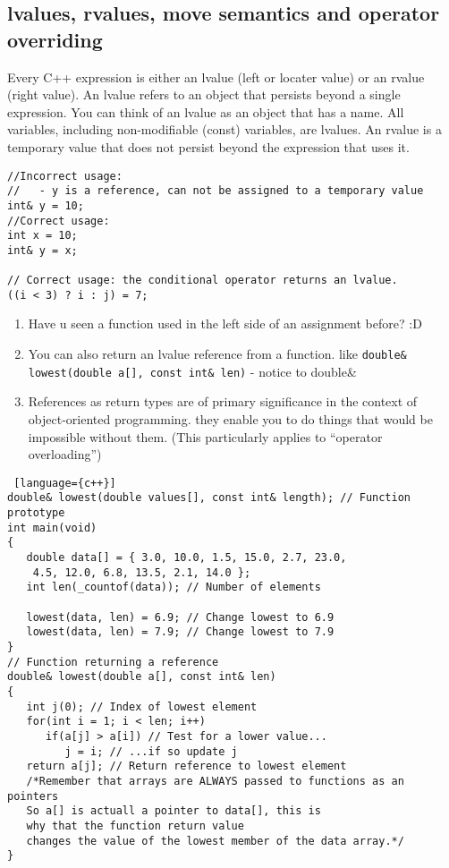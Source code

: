 \subsection{lvalues, rvalues, move semantics and operator overriding}
Every C++ expression is either an lvalue (left or locater value) or an rvalue (right value). An lvalue refers to an object that persists beyond a single expression. You can think of an lvalue as an object that has a name. All variables, including non-modifiable (const) variables, are lvalues. An rvalue is a temporary value that does not persist beyond the expression that uses it. 
\begin{note}
\begin{lstlisting}
//Incorrect usage:
//   - y is a reference, can not be assigned to a temporary value
int& y = 10; 
//Correct usage:
int x = 10;
int& y = x;

// Correct usage: the conditional operator returns an lvalue.
((i < 3) ? i : j) = 7;
\end{lstlisting}
\end{note}
\begin{note}
\begin{enumerate}
\item Have u seen a function used in the left side of an assignment before? :D
\item You can also return an lvalue reference from a function. like \lstinline[columns=fixed]{double& lowest(double a[], const int& len)} - notice to double\&
\item References as return types are of primary significance in the context of object-oriented programming. they enable you to do things that would be
impossible without them. (This particularly applies to “operator overloading”)
\end{enumerate}
\begin{lstlisting} [language={c++}]
double& lowest(double values[], const int& length); // Function prototype
int main(void)
{
   double data[] = { 3.0, 10.0, 1.5, 15.0, 2.7, 23.0,
	4.5, 12.0, 6.8, 13.5, 2.1, 14.0 };
   int len(_countof(data)); // Number of elements

   lowest(data, len) = 6.9; // Change lowest to 6.9
   lowest(data, len) = 7.9; // Change lowest to 7.9
}
// Function returning a reference
double& lowest(double a[], const int& len)
{
   int j(0); // Index of lowest element
   for(int i = 1; i < len; i++)
      if(a[j] > a[i]) // Test for a lower value...
         j = i; // ...if so update j
   return a[j]; // Return reference to lowest element
   /*Remember that arrays are ALWAYS passed to functions as an pointers
   So a[] is actuall a pointer to data[], this is
   why that the function return value
   changes the value of the lowest member of the data array.*/
}
\end{lstlisting}
\end{note}

